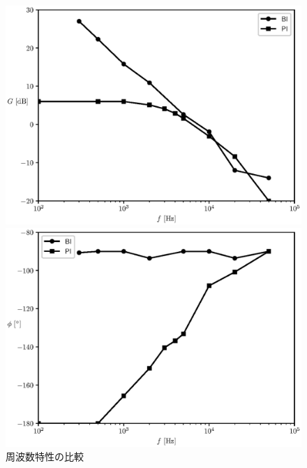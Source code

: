 \documentclass[titlepage]{jsarticle}
\begin{document}
            \begin{figure}[h]
                \begin{minipage}{0.5\hsize}
                    \centering
                    \includegraphics[width=1.1\hsize]{img/int-com-graph1.eps}
                \end{minipage}
                \begin{minipage}{0.5\hsize}
                    \centering
                    \includegraphics[width=1.1\hsize]{img/int-com-graph2.eps}
                \end{minipage}
                \caption{周波数特性の比較}
                \label{fig:int-com-graph}
            \end{figure}
\end{document}
